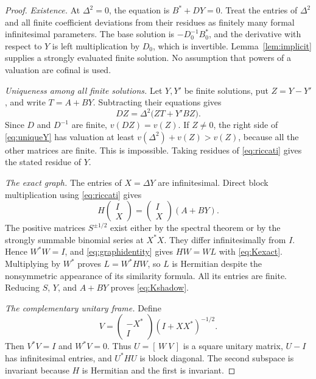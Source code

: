 \documentclass[11pt,oneside]{article}
\numberwithin{equation}{section}
\theoremstyle{plain}
\theoremstyle{definition}
\theoremstyle{remark}
\begin{document}
\begin{proof}
\textit{Existence.}
At $\Delta^2=0$, the equation is $B^*+DY=0$. Treat the entries of $\Delta^2$ and all finite coefficient deviations from their residues as finitely many formal infinitesimal parameters. The base solution is $-D_0^{-1}B_0^*$, and the derivative with respect to $Y$ is left multiplication by $D_0$, which is invertible. Lemma~\ref{lem:implicit} supplies a strongly evaluated finite solution. No assumption that powers of a valuation are cofinal is used.

\textit{Uniqueness among all finite solutions.}
Let $Y,Y'$ be finite solutions, put $Z=Y-Y'$, and write $T=A+BY$. Subtracting their equations gives
\begin{equation}\label{eq:uniqueY}
 DZ=\Delta^2\bigl(ZT+Y'BZ\bigr).
\end{equation}
Since $D$ and $D^{-1}$ are finite, $v(DZ)=v(Z)$. If $Z\ne0$, the right side of \eqref{eq:uniqueY} has valuation at least
$v(\Delta^2)+v(Z)>v(Z)$, because all the other matrices are finite. This is impossible. Taking residues of \eqref{eq:riccati} gives the stated residue of $Y$.

\textit{The exact graph.}
The entries of $X=\Delta Y$ are infinitesimal. Direct block multiplication using \eqref{eq:riccati} gives
\begin{equation}\label{eq:graphidentity}
 H\begin{pmatrix}I\\X\end{pmatrix}
 =\begin{pmatrix}I\\X\end{pmatrix}(A+BY).
\end{equation}
The positive matrices $S^{\pm1/2}$ exist either by the spectral theorem or by the strongly summable binomial series at $X^*X$. They differ infinitesimally from $I$. Hence $W^*W=I$, and \eqref{eq:graphidentity} gives $HW=WL$ with \eqref{eq:Kexact}. Multiplying by $W^*$ proves $L=W^*HW$, so $L$ is Hermitian despite the nonsymmetric appearance of its similarity formula. All its entries are finite. Reducing $S$, $Y$, and $A+BY$ proves \eqref{eq:Kshadow}.

\textit{The complementary unitary frame.}
Define
\[
 V=\begin{pmatrix}-X^*\\I\end{pmatrix}(I+XX^*)^{-1/2}.
\]
Then $V^*V=I$ and $W^*V=0$. Thus $U=[\,W\ V\,]$ is a square unitary matrix, $U-I$ has infinitesimal entries, and $U^*HU$ is block diagonal. The second subspace is invariant because $H$ is Hermitian and the first is invariant.


\end{proof}
\end{document}
